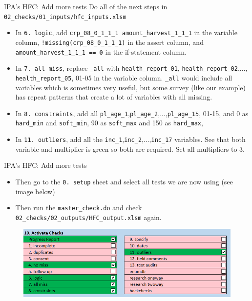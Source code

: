 \documentclass[aspectratio=169]{beamer}
\begin{document}
\begin{frame}{IPA's HFC: Add more tests}
	Do all of the next steps in \texttt{02\_checks/01\_inputs/hfc\_inputs.xlsm}
	\begin{itemize}
		\item In \texttt{6. logic}, add \texttt{crp\_08\_0\_1\_1\_1 amount\_harvest\_1\_1\_1} in the variable column, \texttt{!missing(crp\_08\_0\_1\_1\_1)} in the assert column, and \texttt{amount\_harvest\_1\_1\_1 == 0} in the if-statement column.
		\item In \texttt{7. all miss}, replace \texttt{\_all} with \texttt{health\_report\_01}, \texttt{health\_report\_02},..., \texttt{health\_report\_05}, 01-05 in the variable column. \texttt{\_all} would include all variables which is sometimes very useful, but some survey (like our example) has repeat patterns that create a lot of variables with all missing.
		\item In \texttt{8. constraints}, add all \texttt{pl\_age\_1},\texttt{pl\_age\_2},...,\texttt{pl\_age\_15}, 01-15, and 0 as \texttt{hard\_min} and \texttt{soft\_min}, 90 as \texttt{soft\_max} and 150 as \texttt{hard\_max},
		\item In \texttt{11. outliers}, add all the \texttt{inc\_1},\texttt{inc\_2},...,\texttt{inc\_17} variables. See that both variable and multiplier is green so both are required. Set all multipliers to 3.
	\end{itemize}
\end{frame}

\begin{frame}{IPA's HFC: Add more tests}	
	\begin{itemize}
		\item Then go to the \texttt{0. setup} sheet and select all tests we are now using (see image below)
		\item Then run the \texttt{master\_check.do} and check \texttt{02\_checks/02\_outputs/HFC\_output.xlsm} again.
	\end{itemize}
	
	\begin{figure}
		\centering
		\includegraphics[width=.75\linewidth]{img/ipacheck-setup-add4.png}
	\end{figure}
\end{frame}
\end{document}
